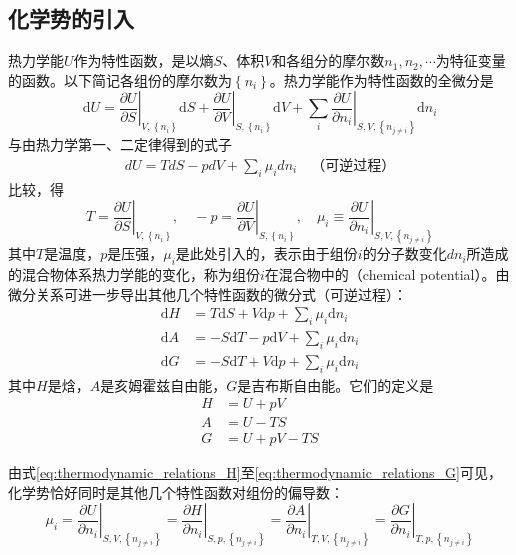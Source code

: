 \documentclass[main.tex]{subfiles}
\begin{document}
\subsection{化学势的引入}
热力学能$U$作为特性函数，是以熵$S$、体积$V$和各组分的摩尔数$n_1,n_2,\cdots$为特征变量的函数。以下简记各组份的摩尔数为$\left\{n_i\right\}$。热力学能作为特性函数的全微分是
\[\mathrm{d}U=\left.\frac{\partial U}{\partial S}\right|_{V,\left\{n_i\right\}}\mathrm{d}S+\left.\frac{\partial U}{\partial V}\right|_{S,\left\{n_i\right\}}\mathrm{d}V+\sum_i\left.\frac{\partial U}{\partial n_i}\right|_{S,V,\left\{n_{j\neq i}\right\}}\mathrm{d}n_i\]
与由热力学第一、二定律得到的式子
\begin{align}
    dU=TdS-pdV+\sum_i\mu_idn_i\quad\text{（可逆过程）}\label{eq:thermodynamic_relations_U}
\end{align}
比较，得
\[T=\left.\frac{\partial U}{\partial S}\right|_{V,\left\{n_i\right\}},\quad-p=\left.\frac{\partial U}{\partial V}\right|_{S,\left\{n_i\right\}},\quad\mu_i\equiv\left.\frac{\partial U}{\partial n_i}\right|_{S,V,\left\{n_{j\neq i}\right\}}\]
其中$T$是温度，$p$是压强，$\mu_i$是此处引入的，表示由于组份$i$的分子数变化$dn_i$所造成的混合物体系热力学能的变化，称为组份$i$在混合物中的（chemical potential）。由微分关系可进一步导出其他几个特性函数的微分式（可逆过程）：
\begin{align}    \mathrm{d}H & =T\mathrm{d}S+V\mathrm{d}p+\sum_i\mu_i\mathrm{d}n_i\label{eq:thermodynamic_relations_H}  \\
                 \mathrm{d}A & =-S\mathrm{d}T-p\mathrm{d}V+\sum_i\mu_i\mathrm{d}n_i\label{eq:thermodynamic_relations_A} \\
                 \mathrm{d}G & =-S\mathrm{d}T+V\mathrm{d}p+\sum_i\mu_i\mathrm{d}n_i\label{eq:thermodynamic_relations_G}
\end{align}
其中$H$是焓，$A$是亥姆霍兹自由能，$G$是吉布斯自由能。它们的定义是
\begin{align}
    H & =U+pV\label{eq:def_of_H}    \\
    A & =U-TS\label{eq:def_of_A}    \\
    G & =U+pV-TS\label{eq:def_of_G}
\end{align}

由式\eqref{eq:thermodynamic_relations_H}至\eqref{eq:thermodynamic_relations_G}可见，化学势恰好同时是其他几个特性函数对组份的偏导数：
\begin{equation}
    \label{eq:chemical_potential_as_partial_molar_characteristic_functions}
    \mu_i=\left.\frac{\partial U}{\partial n_i}\right|_{S,V,\left\{n_{j\neq i}\right\}}=\left.\frac{\partial H}{\partial n_i}\right|_{S,p,\left\{n_{j\neq i}\right\}}=\left.\frac{\partial A}{\partial n_i}\right|_{T,V,\left\{n_{j\neq i}\right\}}=\left.\frac{\partial G}{\partial n_i}\right|_{T,p,\left\{n_{j\neq i}\right\}}
\end{equation}
\end{document}
